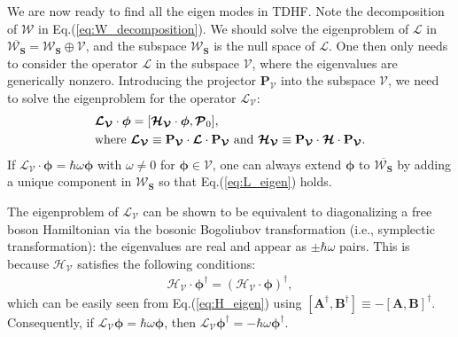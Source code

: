 \begin{subappendices}
We are now ready to find all the eigen modes in TDHF. Note the decomposition of $\boldsymbol{\mathcal W}$ in Eq.(\ref{eq:W_decomposition}). We should solve the eigenproblem of $\boldsymbol{\mathcal L}$ in 
$\overline{\boldsymbol{\mathcal W}_{\mathbf S}}=\boldsymbol{\mathcal W}_{\mathbf S}\oplus \boldsymbol{\mathcal V}$, and the subspace $\boldsymbol{\mathcal W}_{\mathbf S}$ is the null space of $\boldsymbol{\mathcal L}$. One then only needs to consider the operator $\boldsymbol{\mathcal L}$ in the subspace $\boldsymbol{\mathcal V}$, where the eigenvalues are generically nonzero. Introducing the projector $\mathbf P_{\boldsymbol{\mathcal V}}$ into the subspace $\boldsymbol{\mathcal V}$, we need to solve the eigenproblem for the operator $\boldsymbol{\mathcal L}_{\boldsymbol{\mathcal V}}$:
\begin{align}
&\boldsymbol{\mathcal L}_{\boldsymbol{\mathcal V}}\cdot\boldsymbol{\phi}=[\boldsymbol{\mathcal H}_{\boldsymbol{\mathcal V}}\cdot\boldsymbol{\phi},\boldsymbol{\mathcal P}_0],\notag\\
&\text{where }\boldsymbol{\mathcal L}_{\boldsymbol{\mathcal V}}\equiv \mathbf P_{\boldsymbol{\mathcal V}}\cdot\boldsymbol{\mathcal L}\cdot\mathbf P_{\boldsymbol{\mathcal V}}\text{ and }\boldsymbol{\mathcal H}_{\boldsymbol{\mathcal V}}\equiv \mathbf P_{\boldsymbol{\mathcal V}}\cdot\boldsymbol{\mathcal H}\cdot\mathbf P_{\boldsymbol{\mathcal V}}.
\end{align}
If $\boldsymbol{\mathcal L}_{\boldsymbol{\mathcal V}}\cdot \boldsymbol\phi =\hbar\omega \boldsymbol\phi $ with $\omega\neq 0$ for $\boldsymbol\phi\in \boldsymbol{\mathcal V}$, one can always extend $\boldsymbol\phi$ to $\overline{\boldsymbol{\mathcal W}_{\mathbf S}}$ by adding a unique component in $\boldsymbol{\mathcal W}_{\mathbf S}$ so that Eq.(\ref{eq:L_eigen}) holds.

The eigenproblem of $\boldsymbol{\mathcal L}_{\boldsymbol{\mathcal V}}$ can be shown to be equivalent to diagonalizing a free boson Hamiltonian via the bosonic Bogoliubov transformation (i.e., symplectic transformation): the eigenvalues are real and appear as $\pm \hbar\omega$ pairs. This is because $\boldsymbol{\mathcal H}_{\boldsymbol{\mathcal V}}$ satisfies the following conditions:
\begin{align}
\boldsymbol{\mathcal H}_{\boldsymbol{\mathcal V}}\cdot \boldsymbol{\phi}^\dagger=(\boldsymbol{\mathcal H}_{\boldsymbol{\mathcal V}}\cdot \boldsymbol{\phi})^\dagger,
\end{align}
which can be easily seen from Eq.(\ref{eq:H_eigen}) using $[\mathbf A^\dagger,\mathbf B^\dagger]\equiv-[\mathbf A,\mathbf B]^\dagger$. Consequently, if $\boldsymbol{\mathcal L}_{\boldsymbol{\mathcal V}}\boldsymbol{\phi}=\hbar\omega \boldsymbol{\phi}$, then $\boldsymbol{\mathcal L}_{\boldsymbol{\mathcal V}}\boldsymbol{\phi}^\dagger=-\hbar\omega \boldsymbol{\phi}^\dagger$.


\end{subappendices}
